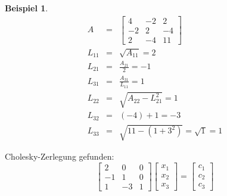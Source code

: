 \documentclass[11pt]{article} %
\theoremstyle{definition}
\newtheorem*{beispiel}{Beispiel}
\begin{document}
\begin{beispiel}
\begin{eqnarray*}
A &=& \begin{bmatrix}
4 & -2 & 2 \\ -2 & 2 & -4 \\ 2 & -4 & 11
\end{bmatrix} \\
L_{11} &=& \sqrt{A_{11}} = 2 \\
L_{21} &=& \frac{A_{21}}{2} = -1 \\
L_{31} &=& \frac{A_{31}}{L_{11}} = 1 \\
L_{22} &=& \sqrt{A_{22} - L_{21}^2} = 1 \\
L_{32} &=& (-4) + 1 = -3 \\
L_{33} &=& \sqrt{11 - (1+3^2)} = \sqrt{1} = 1
\end{eqnarray*}

Cholesky-Zerlegung gefunden:
\[
\begin{bmatrix}
2 & 0 & 0 \\
-1 & 1 & 0 \\
1 & -3 & 1
\end{bmatrix}
\begin{bmatrix}
x_1 \\ x_2 \\ x_3
\end{bmatrix} = \begin{bmatrix}
c_1 \\ c_2 \\ c_3
\end{bmatrix}
\] 

\end{beispiel}
\end{document}
